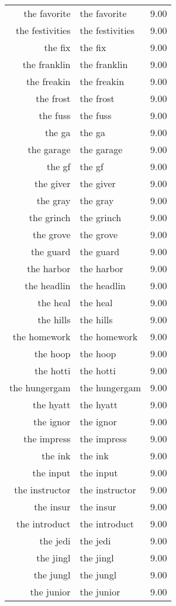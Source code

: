 \begin{table}[ht]
\begin{tabular}{rlr}
  the favorite & the favorite & 9.00 \\ 
  the festivities & the festivities & 9.00 \\ 
  the fix & the fix & 9.00 \\ 
  the franklin & the franklin & 9.00 \\ 
  the freakin & the freakin & 9.00 \\ 
  the frost & the frost & 9.00 \\ 
  the fuss & the fuss & 9.00 \\ 
  the ga & the ga & 9.00 \\ 
  the garage & the garage & 9.00 \\ 
  the gf & the gf & 9.00 \\ 
  the giver & the giver & 9.00 \\ 
  the gray & the gray & 9.00 \\ 
  the grinch & the grinch & 9.00 \\ 
  the grove & the grove & 9.00 \\ 
  the guard & the guard & 9.00 \\ 
  the harbor & the harbor & 9.00 \\ 
  the headlin & the headlin & 9.00 \\ 
  the heal & the heal & 9.00 \\ 
  the hills & the hills & 9.00 \\ 
  the homework & the homework & 9.00 \\ 
  the hoop & the hoop & 9.00 \\ 
  the hotti & the hotti & 9.00 \\ 
  the hungergam & the hungergam & 9.00 \\ 
  the hyatt & the hyatt & 9.00 \\ 
  the ignor & the ignor & 9.00 \\ 
  the impress & the impress & 9.00 \\ 
  the ink & the ink & 9.00 \\ 
  the input & the input & 9.00 \\ 
  the instructor & the instructor & 9.00 \\ 
  the insur & the insur & 9.00 \\ 
  the introduct & the introduct & 9.00 \\ 
  the jedi & the jedi & 9.00 \\ 
  the jingl & the jingl & 9.00 \\ 
  the jungl & the jungl & 9.00 \\ 
  the junior & the junior & 9.00 \\ 

\end{tabular}
\end{table}
